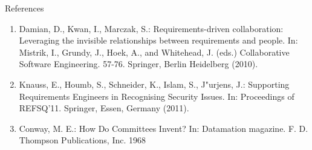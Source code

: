 \documentclass[final]{beamer} %
\begin{document}
\begin{frame}{}


\begin{columns}[b]

  \begin{column}{.45\linewidth}
    \begin{block}{References}
    \begin{enumerate}
    \scriptsize
    \item Damian, D., Kwan, I., Marczak, S.: Requirements-driven collaboration: Leveraging the invisible relationships between requirements and people. In: Mistrik, I., Grundy, J., Hoek, A., and Whitehead, J. (eds.) Collaborative Software Engineering. 57-76. Springer, Berlin Heidelberg (2010).
\item Knauss, E., Houmb, S., Schneider, K., Islam, S., J{"u}rjens, J.: Supporting Requirements Engineers in Recognising Security Issues. In: Proceedings of REFSQ’11. Springer, Essen, Germany (2011).
    \item Conway, M. E.: How Do Committees Invent? In: Datamation magazine. F. D. Thompson Publications, Inc. 1968
    \end{enumerate}
    \end{block}
  \end{column}
  


\end{columns}
\end{frame}
\end{document}
